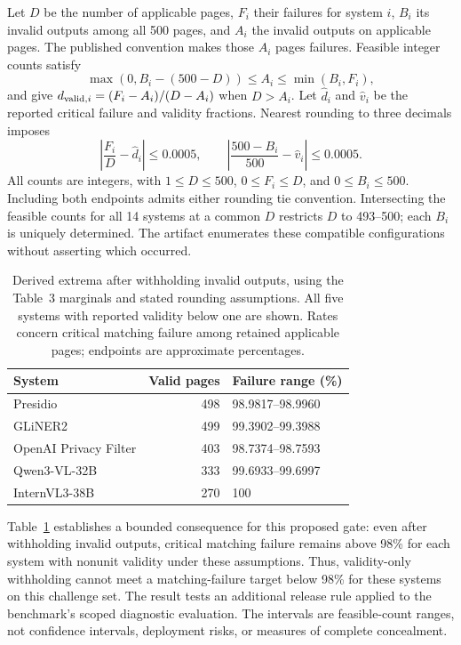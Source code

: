 \documentclass[conference]{IEEEtran}
\begin{document}
Let $D$ be the number of applicable pages, $F_i$ their failures for system $i$, $B_i$ its invalid outputs among all 500 pages, and $A_i$ the invalid outputs on applicable pages. The published convention makes those $A_i$ pages failures. Feasible integer counts satisfy
\begin{equation}
 \max(0,B_i-(500-D))\leq A_i\leq\min(B_i,F_i),
\end{equation}
and give $d_{{\rm valid},i}=(F_i-A_i)/(D-A_i)$ when $D>A_i$. Let $\widehat d_i$ and $\widehat v_i$ be the reported critical failure and validity fractions. Nearest rounding to three decimals imposes
\begin{equation}
 \left|\frac{F_i}{D}-\widehat d_i\right|\leq0.0005,
 \qquad
 \left|\frac{500-B_i}{500}-\widehat v_i\right|\leq0.0005.
 \label{eq:rounding}
\end{equation}
All counts are integers, with $1\leq D\leq500$, $0\leq F_i\leq D$, and $0\leq B_i\leq500$. Including both endpoints admits either rounding tie convention. Intersecting the feasible counts for all 14 systems at a common $D$ restricts $D$ to 493--500; each $B_i$ is uniquely determined. The artifact enumerates these compatible configurations without asserting which occurred.

\begin{table}[t]
\centering
\caption{Derived extrema after withholding invalid outputs, using the Table~3 marginals and stated rounding assumptions. All five systems with reported validity below one are shown. Rates concern critical matching failure among retained applicable pages; endpoints are approximate percentages.}
\label{tab:aggregate}
\small
\begin{tabular}{@{}p{}rp{}@{}}
\toprule
System & Valid pages & Failure range (\%) \\
\midrule
Presidio & 498 & 98.9817--98.9960 \\
GLiNER2 & 499 & 99.3902--99.3988 \\
OpenAI Privacy Filter & 403 & 98.7374--98.7593 \\
Qwen3-VL-32B & 333 & 99.6933--99.6997 \\
InternVL3-38B & 270 & 100 \\
\bottomrule
\end{tabular}
\end{table}

Table~\ref{tab:aggregate} establishes a bounded consequence for this proposed gate: even after withholding invalid outputs, critical matching failure remains above 98\% for each system with nonunit validity under these assumptions. Thus, validity-only withholding cannot meet a matching-failure target below 98\% for these systems on this challenge set. The result tests an additional release rule applied to the benchmark's scoped diagnostic evaluation. The intervals are feasible-count ranges, not confidence intervals, deployment risks, or measures of complete concealment.
\end{document}
